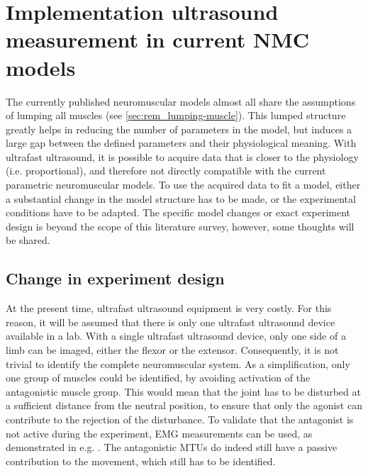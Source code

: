 \section{Implementation ultrasound measurement in current NMC models}
\label{sec:rem_incompatibility}
The currently published neuromuscular models almost all share the assumptions of lumping all muscles (see \autoref{sec:rem_lumping-muscle}). This lumped structure greatly helps in reducing the number of parameters in the model, but induces a large gap between the defined parameters and their physiological meaning. With ultrafast ultrasound, it is possible to acquire data that is closer to the physiology (i.e. proportional), and therefore not directly compatible with the current parametric neuromuscular models. To use the acquired data to fit a model, either a substantial change in the model structure has to be made, or the experimental conditions have to be adapted. The specific model changes or exact experiment design is beyond the scope of this literature survey, however, some thoughts will be shared.




\subsection{Change in experiment design}
At the present time, ultrafast ultrasound equipment is very costly. For this reason, it will be assumed that there is only one ultrafast ultrasound device available in a lab. With a single ultrafast ultrasound device, only one side of a limb can be imaged, either the flexor or the extensor. Consequently, it is not trivial to identify the complete neuromuscular system. As a simplification, only one group of muscles could be identified, by avoiding activation of the antagonistic muscle group. This would mean that the joint has to be disturbed at a sufficient distance from the neutral position, to ensure that only the agonist can contribute to the rejection of the disturbance. To validate that the antagonist is not active during the experiment, EMG measurements can be used, as demonstrated in e.g. \cite{kearney_identification_1997, mirbagheri_intrinsic_2000}. The antagonistic MTUs do indeed still have a passive contribution to the movement, which still has to be identified. 

